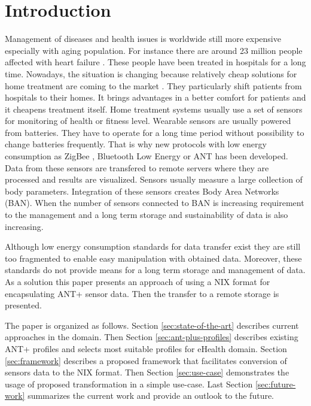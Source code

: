 \documentclass[conference]{IEEEtran}
\begin{document}
\section{Introduction}\label{sec:intro}
Management of diseases and health issues is worldwide still more expensive especially with aging population. For instance there are around 23 million people affected with heart failure \cite{bui2011epidemiology}. These people have been treated in hospitals for a long time. Nowadays, the situation is changing because relatively cheap solutions for home treatment are coming to the market \cite{4761985, 5333913}. They particularly shift patients from hospitals to their homes. It brings advantages in a better comfort for patients and it cheapens treatment itself. Home treatment systems usually use a set of sensors for monitoring of health or fitness level. Wearable sensors are usually powered from batteries. They have to operate for a long time period without possibility to change batteries frequently. That is why new protocols with low energy consumption as ZigBee \cite{Farahani:2008:ZWN:1457417}, Bluetooth Low Energy \cite{heydon2012bluetooth} or ANT \cite{zaloker2014ant} has been developed.  Data from these sensors are transfered to remote servers where they are processed and results are visualized. Sensors usually measure a large collection of body parameters. Integration of these sensors creates Body Area Networks (BAN). When the number of sensors connected to BAN is increasing requirement to the management and a long term storage and sustainability of data is also increasing.

Although low energy consumption standards for data transfer exist they are still too fragmented to enable easy manipulation with obtained data. Moreover, these standards do not provide means for a long term storage and management of data. As a solution this paper presents an approach of using a NIX format\cite{NIX} for encapsulating ANT+ sensor data. Then the transfer to a remote storage is presented. 

The paper is organized as follows. Section \ref{sec:state-of-the-art} describes current approaches in the domain. Then Section \ref{sec:ant-plus-profiles} describes existing ANT+ profiles and selects most suitable profiles for eHealth domain. Section \ref{sec:framework} describes a proposed framework that facilitates conversion of sensors data to the NIX format. Then Section \ref{sec:use-case} demonstrates the usage of proposed transformation in a simple use-case. Last Section \ref{sec:future-work} summarizes the current work and provide an outlook to the future.
\end{document}
